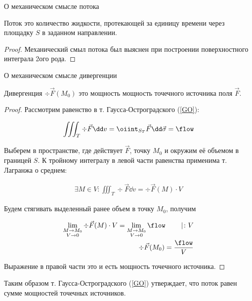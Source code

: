 
\begin{theorem}
  О механическом смысле потока

  Поток это количество жидкости, протекающей за единицу времени через площадку
  \(S\) в заданном направлении.
\end{theorem}
\begin{proof}
  Механический смыл потока был выяснен при построении поверхностного интеграла
  2ого рода.
\end{proof}

\begin{theorem}
  О механическом смысле дивергенции

  Дивергенция \(\div \vec{F}(M_{0})\) это мощность мощность точечного источника
  поля \(\vec{F}\).
\end{theorem}
\begin{proof}
  Рассмотрим равенство в т. Гаусса-Остроградского (\ref{GO}):

  \begin{align*}
    \iiint_{T} \div \vec{F} \dd v
    = \oiint_{S_{T}} \vec{F} \dd \vec{\sigma}
    = \flow
  \end{align*}

  Выберем в пространстве, где действует \(\vec{F}\), точку \(M_{0}\) и окружим
  её объемом в границей \(S\). К тройному интегралу в левой части равенства
  применима т. Лагранжа о среднем:

  \begin{align*}
    \exists M \in V \colon
      \iiint_{T} \div \vec{F} \dd v = \div \vec{F}(M) \cdot V
  \end{align*}

  Будем стягивать выделенный ранее объем в точку \(M_{0}\), получим

  \begin{align*}
    \lim_{\substack{M \to M_{0} \\ V \to 0}}
      \div \vec{F}(M) \cdot V = 
    \lim_{\substack{M \to M_{0} \\ V \to 0}}
      \flow
    \hspace{20pt} \mid \colon V
    \\
    \div \vec{F}(M_{0}) = \frac{\flow}{V}
  \end{align*}

  Выражение в правой части это и есть мощность точечного источника.
\end{proof}

\begin{corollary}
  Таким образом т. Гаусса-Остроградского (\ref{GO}) утверждает, что поток равен
  сумме мощностей точечных источников.
\end{corollary}